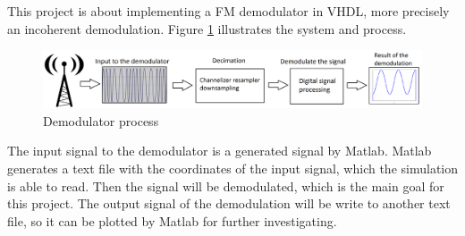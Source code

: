 This project is about implementing a FM demodulator in VHDL, more precisely an incoherent demodulation. Figure \ref{fig:induction} illustrates the system and process.

\begin{figure}[h]
 \centering
 \includegraphics[scale=0.2]{images/induc.png}
 \caption{Demodulator process}
 \label{fig:induction}
\end{figure}

The input signal to the demodulator is a generated signal by Matlab. Matlab generates a text file with the coordinates of the input signal, which the simulation is able to read. Then the signal will be demodulated, which is the main goal for this project. The output signal of the demodulation will be write to another text file, so it can be plotted by Matlab for further investigating.